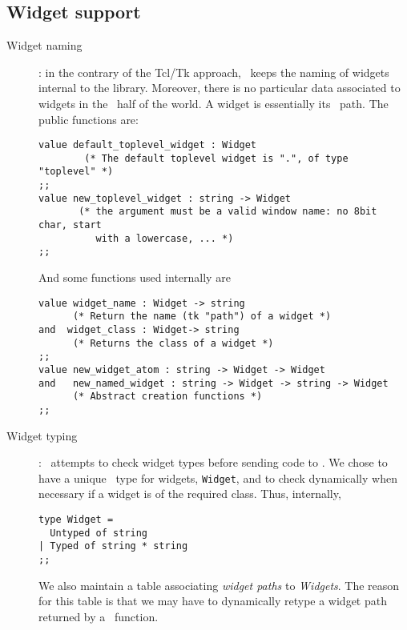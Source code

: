 \subsection{Widget support}
\begin{description}
\item[Widget naming] :
in the contrary of the {\sf Tcl/Tk} approach, \camltk\ keeps the naming of
widgets internal to the library. Moreover, there is no particular data
associated to widgets in the \caml\ half of the world. A widget is
essentially its \tk\ path. The public functions are: 

\begin{verbatim}
value default_toplevel_widget : Widget
      	(* The default toplevel widget is ".", of type "toplevel" *)
;;
value new_toplevel_widget : string -> Widget
       (* the argument must be a valid window name: no 8bit char, start
          with a lowercase, ... *)
;;
\end{verbatim} 
And some functions used internally are
\begin{verbatim}
value widget_name : Widget -> string
      (* Return the name (tk "path") of a widget *)
and  widget_class : Widget-> string
      (* Returns the class of a widget *)
;;
value new_widget_atom : string -> Widget -> Widget
and   new_named_widget : string -> Widget -> string -> Widget
      (* Abstract creation functions *)
;;
\end{verbatim} 

\item[Widget typing] :
\camltk\ attempts to check widget types before sending code to \tcl.
We chose to have a unique \caml\ type for widgets, \verb|Widget|, and
to check dynamically when necessary if a widget is of the required class.
Thus, internally, 
\begin{verbatim}
type Widget =
  Untyped of string
| Typed of string * string
;;
\end{verbatim} 
We also maintain a table associating {\em widget paths} to {\em Widgets}.
The reason for this table is that we may have to dynamically retype a widget
path returned by a \tcl\ function.

\end{description}



